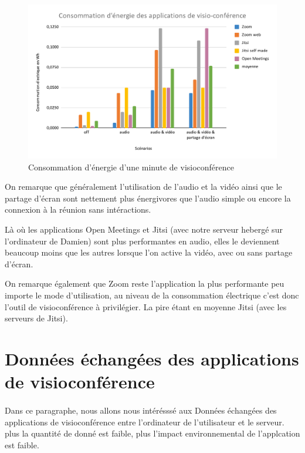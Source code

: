 \documentclass[11pt,a4paper]{report}
\begin{document}
\begin{figure}[h]
  \centering
  \includegraphics[width=1\linewidth]{graph_energie.pdf}
  \caption{Consommation d'énergie d'une minute de visioconférence}
  \label{fig:graph_energie}
\end{figure}

On remarque que généralement l'utilisation de l'audio et la vidéo ainsi que le partage d'écran sont nettement plus énergivores que l'audio simple ou encore la connexion à la réunion sans intéractions.

Là où les applications Open Meetings et Jitsi (avec notre serveur hebergé sur l'ordinateur de Damien) sont plus performantes en audio, elles le deviennent beaucoup moins que les autres lorsque l'on active la vidéo, avec ou sans partage d'écran.

On remarque également que Zoom reste l'application la plus performante peu importe le mode d'utilisation, au niveau de la consommation électrique c'est donc l'outil de visioconférence à privilégier. La pire étant en moyenne Jitsi (avec les serveurs de Jitsi).


\section{Données échangées des applications de visioconférence}

\paragraph{}
Dans ce paragraphe, nous allons nous intérésssé aux Données échangées des applications de visioconférence entre l'ordinateur de l'utilisateur et le serveur. plus la quantité de donné est faible, plus l'impact environnemental de l'applcation est faible.
\end{document}
